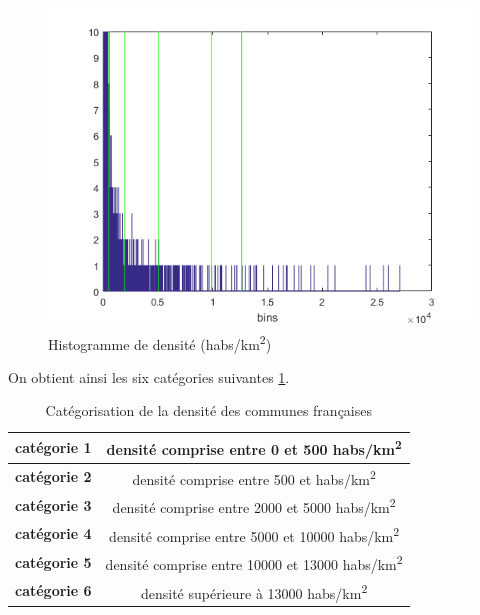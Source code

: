 \documentclass{book}
\begin{document}
\begin{figure}[H]
\begin{center}
  \includegraphics[scale=0.7]{images/labels/densite_histo_otsu_zoom.png}
\end{center}
\caption{Histogramme de densité (habs/km\textsuperscript{2})}
\label{densite_histo_otsu}
\end{figure}

On obtient ainsi les six catégories suivantes \ref{tab_meta_categorie}.

\begin{table}[H]
\begin{center}
\begin{adjustbox}{max width=\textwidth}
{
\begin{tabular}{|c|c|}
    \hline 
    \textbf{catégorie 1} & densité comprise entre 0 et 500 habs/km\textsuperscript{2}\\
    \hline
    \textbf{catégorie 2} & densité comprise entre 500 et habs/km\textsuperscript{2}\\
    \hline
    \textbf{catégorie 3} & densité comprise entre 2000 et 5000 habs/km\textsuperscript{2}\\
    \hline
    \textbf{catégorie 4} & densité comprise entre 5000 et 10000 habs/km\textsuperscript{2}\\
    \hline
    \textbf{catégorie 5} & densité comprise entre 10000 et 13000 habs/km\textsuperscript{2}\\
    \hline
    \textbf{catégorie 6} & densité supérieure à 13000 habs/km\textsuperscript{2}\\
    \hline
\end{tabular}
}
\end{adjustbox}
\end{center}
\caption{Catégorisation de la densité des communes françaises}
\label{tab_meta_categorie}
\end{table}
\end{document}
